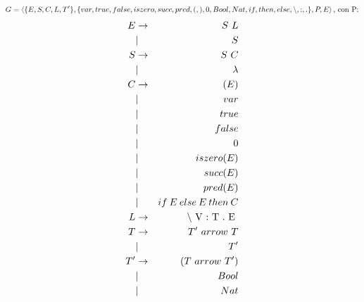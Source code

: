 \documentclass[spanish, a4paper]{article}
\begin{document}
$$G = \left<  \{E,S, C, L, T'\}, \{var, true, false, iszero, succ, pred, (, ), 0, Bool, Nat, if, then, else,  \textnormal{\textbackslash}, :, . \}, P, E  \right> \textnormal{, con P:} $$
\begin{eqnarray}
  E & \rightarrow  & S\ L \nonumber \\
    & |            & S  \nonumber \\
  S & \rightarrow  & S\ C \nonumber \\
    & |            & \lambda  \nonumber\\
  C & \rightarrow & (E)  \nonumber\\
    & |           & var  \nonumber\\
    & |           & true  \nonumber\\
    & |           & false  \nonumber\\
    & |           & 0 \nonumber \\
    & |           & iszero(E)  \nonumber\\
    & |           & succ(E)  \nonumber\\
    & |           & pred(E)  \nonumber\\
    & |           & if \: E \: else \: E \: then \: C  \nonumber\\
    L & \rightarrow &  \textnormal{\textbackslash\ V :\ T .\ E } \nonumber\\
  T & \rightarrow & T'\ arrow\ T  \nonumber\\
     & |           & T'  \nonumber\\
  T' & \rightarrow & (T\ arrow\ T')  \nonumber\\
    & |           & Bool  \nonumber\\
     & |           & Nat  \nonumber\\
\end{eqnarray}
\end{document}
